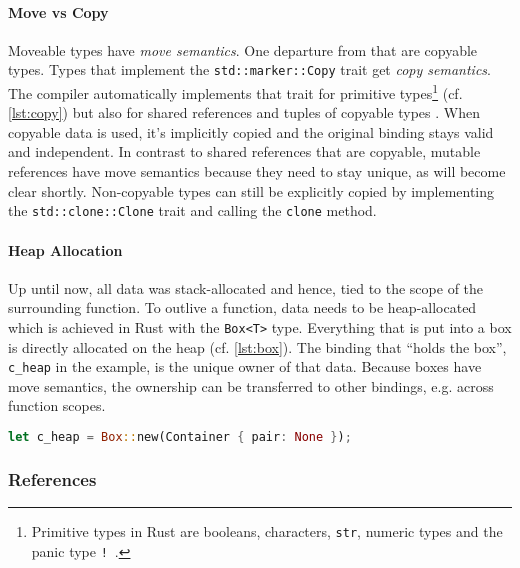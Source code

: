 \paragraph{Move vs Copy}

Moveable types have \emph{move semantics}. One departure from that are copyable
types. Types that implement the \lstinline!std::marker::Copy! trait get
\emph{copy semantics}. The compiler automatically implements that trait for
primitive types\footnote{Primitive types in Rust are booleans, characters,
\lstinline!str!, numeric types and the panic type \texttt{!}~\cite{rustref}.}
(cf. \autoref{lst:copy}) but also for shared references and tuples of copyable
types \cite[section "Special types and traits"]{rustref}. When copyable data is
used, it's implicitly copied and the original binding stays valid and
independent. In contrast to shared references that are copyable, mutable
references have move semantics because they need to stay unique, as will become
clear shortly. Non-copyable types can still be explicitly copied by implementing
the \lstinline!std::clone::Clone! trait and calling the \lstinline!clone!
method.

\paragraph{Heap Allocation}

Up until now, all data was stack-allocated and hence, tied to the scope of the
surrounding function. To outlive a function, data needs to be heap-allocated
which is achieved in Rust with the \lstinline!Box<T>! type. Everything that is
put into a box is directly allocated on the heap (cf. \autoref{lst:box}). The
binding that ``holds the box'', \lstinline!c_heap! in the example, is the unique
owner of that data. Because boxes have move semantics, the ownership can be
transferred to other bindings, e.g. across function scopes.

\begin{lstlisting}[language=Rust, label=lst:box, caption={A heap-allocated container.}, style=short]
let c_heap = Box::new(Container { pair: None });
\end{lstlisting}

\subsubsection{References}
\label{references}

